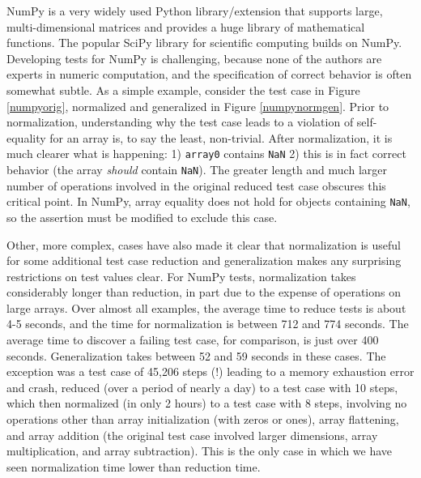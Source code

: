NumPy \cite{NumPy} is a very widely used Python library/extension that supports
large, multi-dimensional matrices and provides a huge library of
mathematical functions.  The popular SciPy library for scientific
computing builds on NumPy.  Developing tests for NumPy is challenging,
because none of the authors are experts in numeric computation, and
the specification of correct behavior is often somewhat subtle.  As a
simple example, consider the test case in Figure \ref{numpyorig},
normalized and generalized in Figure \ref{numpynormgen}.  Prior to
normalization, understanding why the test case leads to a violation of
self-equality for an array is, to say the least, non-trivial.  After
normalization, it is much clearer what is happening:
1) {\tt array0} contains {\tt NaN} 2) this is in fact correct
behavior (the array \emph{should} contain {\tt NaN}).  The greater
length and much larger number of operations involved in the original
reduced test case obscures this critical point.  In NumPy, array
equality does not hold for objects containing {\tt NaN}, so the
assertion must be modified to exclude this case.

Other, more complex, cases have also made it clear that normalization
is useful for some additional test case reduction and generalization
makes any surprising restrictions on test values clear.  For NumPy
tests, normalization takes considerably longer than reduction, in part
due to the expense of operations on large arrays.  Over almost all
examples, the average time to reduce tests is about 4-5 seconds, and
the time for normalization is between 712 and 774 seconds.  The
average time to discover a failing test case, for comparison, is just
over 400 seconds.  Generalization takes between 52 and 59 seconds in
these cases.  The exception was a test case of 45,206 steps (!)
leading to a memory exhaustion error and crash, reduced (over a period
of nearly a day) to a test case with 10 steps, which then normalized
(in only 2 hours) to a test case with 8 steps, involving no operations
other than array initialization (with zeros or ones), array
flattening, and array addition (the original test case involved larger
dimensions, array multiplication, and array subtraction).  This is the
only case in which we have seen normalization time lower than
reduction time.

